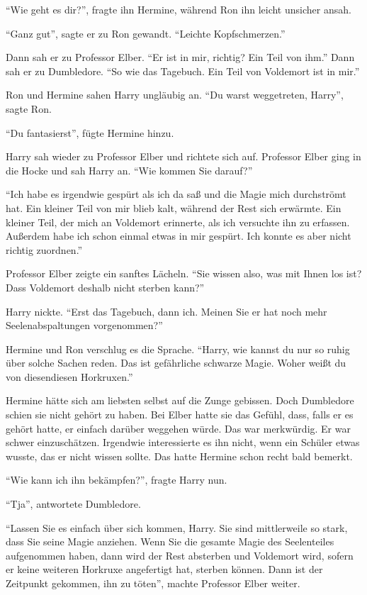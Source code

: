 \enquote{Wie geht es dir?}, fragte ihn Hermine, während Ron ihn leicht unsicher ansah.

\enquote{Ganz gut}, sagte er zu Ron gewandt. \enquote{Leichte Kopfschmerzen.}

Dann sah er zu Professor Elber. \enquote{Er ist in mir, richtig? Ein Teil von ihm.} Dann sah er zu Dumbledore. \enquote{So wie das Tagebuch. Ein Teil von Voldemort ist in mir.}

Ron und Hermine sahen Harry ungläubig an. \enquote{Du warst weggetreten, Harry}, sagte Ron.

\enquote{Du fantasierst}, fügte Hermine hinzu.

Harry sah wieder zu Professor Elber und richtete sich auf. Professor Elber ging in die Hocke und sah Harry an. \enquote{Wie kommen Sie darauf?}

\enquote{Ich habe es irgendwie gespürt als ich da saß und die Magie mich durchströmt hat. Ein kleiner Teil von mir blieb kalt, während der Rest sich erwärmte. Ein kleiner Teil, der mich an Voldemort erinnerte, als ich versuchte ihn zu erfassen. Außerdem habe ich schon einmal etwas in mir gespürt. Ich konnte es aber nicht richtig zuordnen.}

Professor Elber zeigte ein sanftes Lächeln. \enquote{Sie wissen also, was mit Ihnen los ist? Dass Voldemort deshalb nicht sterben kann?}

Harry nickte. \enquote{Erst das Tagebuch, dann ich. \gst Meinen Sie er hat noch mehr \gst Seelenabspaltungen vorgenommen?}

Hermine und Ron verschlug es die Sprache. \enquote{Harry, wie kannst du nur so ruhig über solche Sachen reden. Das ist gefährliche schwarze Magie. Woher weißt du von diesen\abs diesen Horkruxen.}

Hermine hätte sich am liebsten selbst auf die Zunge gebissen. Doch Dumbledore schien sie nicht gehört zu haben. Bei Elber hatte sie das Gefühl, dass, falls er es gehört hatte, er einfach darüber weggehen würde. Das war merkwürdig. Er war schwer einzuschätzen. Irgendwie interessierte es ihn nicht, wenn ein Schüler etwas wusste, das er nicht wissen sollte. Das hatte Hermine schon recht bald bemerkt.

\enquote{Wie kann ich ihn bekämpfen?}, fragte Harry nun.

\enquote{Tja}, antwortete Dumbledore.

\enquote{Lassen Sie es einfach über sich kommen, Harry. Sie sind mittlerweile so stark, dass Sie seine Magie anziehen. Wenn Sie die gesamte Magie des Seelenteiles aufgenommen haben, dann wird der Rest absterben und Voldemort wird, sofern er keine weiteren Horkruxe angefertigt hat, sterben können. Dann ist der Zeitpunkt gekommen, ihn zu töten}, machte Professor Elber weiter.

